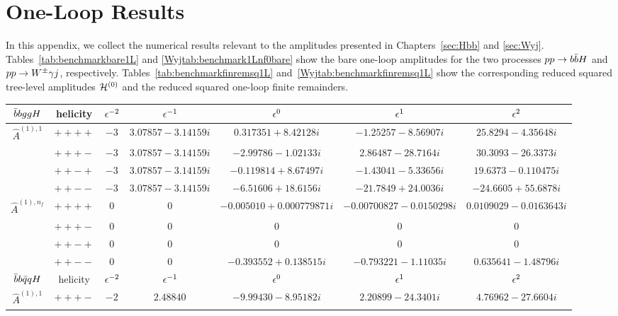 \documentclass[main.tex]{subfiles}
\begin{document}
\renewcommand{\theequation}{E.\arabic{equation}}
\chapter{One-Loop Results}
\label{app:oneloop}
In this appendix, we collect the numerical results relevant to the amplitudes presented in Chapters~\ref{sec:Hbb} and \ref{sec:Wyj}. Tables~\ref{tab:benchmarkbare1L} and \ref{Wyjtab:benchmark1Lnf0bare} show the bare one-loop amplitudes for the two processes $pp \rightarrow b\bar{b}H$ and $pp \rightarrow W^\pm \gamma j$, respectively. Tables~\ref{tab:benchmarkfinremsq1L} and~\ref{Wyjtab:benchmarkfinremsq1L} show the corresponding reduced squared tree-level amplitudes $\mathcal{H}^{(0)}$ and the reduced squared one-loop finite remainders.
\begin{table}[t!]
\centering
\begin{tabularx}{1.0\textwidth}{|C{0.7}|C{0.8}|C{0.5}|C{1.2}|C{1.2}|C{1.3}|C{1.3}|}
\hline
 $\bar{b}bggH$     & helicity & $\epsilon^{-2}$ & $\epsilon^{-1}$ & $\epsilon^{0}$ & $\epsilon^{1}$ & $\epsilon^{2}$ \\
\hline
$\hat A^{(1),1}$ & $++++$ & $ -3 $ & $ 3.07857 - 3.14159 i$ & $ 0.317351 + 8.42128 i$ & $ -1.25257 - 8.56907 i$ & $ 25.8294 - 4.35648 i $ \\
                 & $+++-$ & $ -3 $ & $ 3.07857 - 3.14159 i$ & $ -2.99786 - 1.02133 i$ & $ 2.86487 - 28.7164 i$ & $ 30.3093 - 26.3373 i $ \\
                 & $++-+$ & $ -3 $ & $ 3.07857 - 3.14159 i$ & $ -0.119814 + 8.67497 i$ & $ -1.43041 - 5.33656 i$ & $ 19.6373 - 0.110475 i $ \\
                 & $++--$ & $ -3 $ & $ 3.07857 - 3.14159 i$ & $ -6.51606 + 18.6156 i$ & $ -21.7849 + 24.0036 i$ & $ -24.6605 + 55.6878 i $ \\
\hline
$\hat A^{(1),n_f}$ & $++++$ & $ 0$ & $ 0$ & $ -0.005010 + 0.000779871 i$ & $ -0.00700827 - 0.0150298 i$ & $ 0.0109029 - 0.0163643 i $ \\
                   & $+++-$ & $ 0$ & $ 0$ & $ 0$ & $ 0$ & $ 0 $ \\
                   & $++-+$ & $ 0$ & $ 0$ & $ 0$ & $ 0$ & $ 0 $ \\
                   & $++--$ & $ 0$ & $ 0$ & $ -0.393552 + 0.138515 i$ & $ -0.793221 - 1.11035 i$ & $ 0.635641 - 1.48796 i $ \\
\hline
$\bar{b}b\bar{q}qH$     & helicity & $\epsilon^{-2}$ & $\epsilon^{-1}$ & $\epsilon^{0}$ & $\epsilon^{1}$ & $\epsilon^{2}$ \\
\hline
$\hat A^{(1),1}$ & $+++-$ & $ -2 $ & $ 2.48840$ & $ -9.99430 - 8.95182 i$ & $ 2.20899 - 24.3401 i$ & $ 4.76962 - 27.6604 i $ \\

\end{tabularx}
\end{table}
\end{document}
